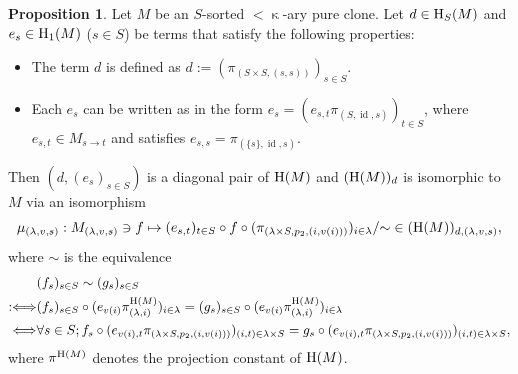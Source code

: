 \documentclass[a4paper,10pt]{article}
\theoremstyle{definition}
\newtheorem{prop}[df]{Proposition}
\newcommand\ra{\rightarrow}
\DeclareMathOperator{\id}{id}
\newcommand\mc{\mathclose}
\begin{document}
\begin{prop}\label{clone-many}
Let $M$ be an $S$-sorted $<\mc\kappa$-ary pure clone.
Let $d\in {\rm H}_S(M)$ and $e_s\in {\rm H}_1(M)$ ($s\in S$) be terms that
satisfy the following properties:
\begin{itemize}
\item
The term $d$ is defined as $d:=(\pi_{(S\times S,(s,s))})_{s\in S}$.
\item
Each $e_s$ can be written as in the form
$e_s=(e_{s,t}\pi_{(S,\id,s)})_{t\in S}$, where $e_{s,t}\in M_{s\ra t}$
and satisfies \mbox{$e_{s,s}=\pi_{(\{s\},\id,s)}$}.
\end{itemize}
Then $(d,(e_s)_{s\in S})$ is a diagonal pair of ${\rm H}(M)$ and
$({\rm H}(M))_d$ is isomorphic to $M$ via an isomorphism
\[
\mu_{(\lambda,v,s)}:M_{(\lambda,v,s)}\ni
f \mapsto (e_{s,t})_{t\in S}\circ f\circ 
(%
\pi_{(\lambda\times S,p_2,(i,v(i)))})_{i\in\lambda}/\mc\sim
\in ({\rm H}(M))_{d,(\lambda,v,s)},
\]
where $\sim$ is the equivalence
\begin{align*}
&(f_s)_{s\in S}\sim (g_s)_{s\in S}\\
:\Longleftrightarrow&
  (f_s)_{s\in S}\circ (e_{v(i)}\pi_{(\lambda,i)}^{{\rm H}(M)})_{i\in\lambda}
 =(g_s)_{s\in S}\circ (e_{v(i)}\pi_{(\lambda,i)}^{{\rm H}(M)})_{i\in\lambda}\\
\Longleftrightarrow&
 \forall s\in S;
  f_s\circ (e_{v(i),t}\pi_{(\lambda\times S,p_2,(i,v(i)))})_{(i,t)\in\lambda\times S}
 =g_s\circ (e_{v(i),t}\pi_{(\lambda\times S,p_2,(i,v(i)))})_{(i,t)\in\lambda\times S},
\end{align*}
where $\pi^{{\rm H}(M)}$ denotes the projection constant of ${\rm H}(M)$.
\end{prop}
\end{document}
